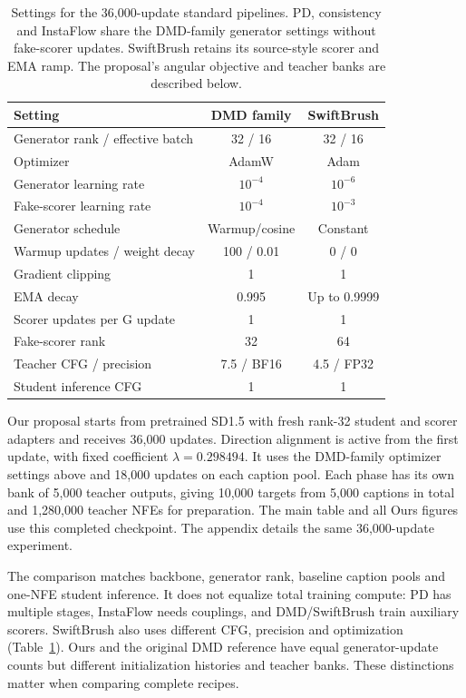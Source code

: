 \documentclass[10pt,twocolumn,letterpaper]{article}
\begin{document}
\begin{table}[t]
\centering\scriptsize
\setlength{\tabcolsep}{3pt}
\begin{tabular}{lcc}
\toprule
Setting & DMD family & SwiftBrush \\
\midrule
Generator rank / effective batch & 32 / 16 & 32 / 16 \\
Optimizer & AdamW & Adam \\
Generator learning rate & $10^{-4}$ & $10^{-6}$ \\
Fake-scorer learning rate & $10^{-4}$ & $10^{-3}$ \\
Generator schedule & Warmup/cosine & Constant \\
Warmup updates / weight decay & 100 / 0.01 & 0 / 0 \\
Gradient clipping & 1 & 1 \\
EMA decay & 0.995 & Up to 0.9999 \\
Scorer updates per G update & 1 & 1 \\
Fake-scorer rank & 32 & 64 \\
Teacher CFG / precision & 7.5 / BF16 & 4.5 / FP32 \\
Student inference CFG & 1 & 1 \\
\bottomrule
\end{tabular}
\caption{Settings for the 36,000-update standard pipelines. PD, consistency
and InstaFlow share the DMD-family generator settings without fake-scorer
updates. SwiftBrush retains its source-style scorer and EMA ramp. The
proposal's angular objective and teacher banks are described below.}
\label{tab:settings}
\end{table}

Our proposal starts from pretrained SD1.5 with fresh rank-32 student and
scorer adapters and receives 36,000 updates. Direction alignment is active
from the first update, with fixed coefficient $\lambda=0.298494$. It uses the DMD-family optimizer settings above
and 18,000 updates on each caption pool. Each phase has its own bank of
5,000 teacher outputs, giving 10,000 targets from 5,000 captions in total
and 1,280,000 teacher NFEs for preparation. The main table and all Ours
figures use this completed checkpoint. The appendix details the same
36,000-update experiment.

The comparison matches backbone, generator rank, baseline caption pools
and one-NFE student inference. It does not equalize total training compute:
PD has multiple stages, InstaFlow needs couplings, and DMD/SwiftBrush train
auxiliary scorers. SwiftBrush also uses different CFG, precision and
optimization (Table~\ref{tab:settings}). Ours and the original DMD reference
have equal generator-update counts but different initialization histories
and teacher banks. These distinctions matter when comparing complete recipes.
\end{document}
